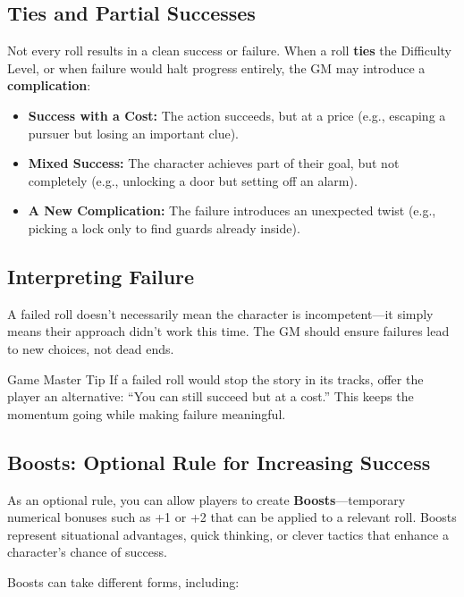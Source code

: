 \subsection{Ties and Partial Successes}
Not every roll results in a clean success or failure. When a roll \textbf{ties} the Difficulty Level, or when failure would halt progress entirely, the GM may introduce a \textbf{complication}:

\begin{itemize}
    \item \textbf{Success with a Cost:} The action succeeds, but at a price (e.g., escaping a pursuer but losing an important clue).
    \item \textbf{Mixed Success:} The character achieves part of their goal, but not completely (e.g., unlocking a door but setting off an alarm).
    \item \textbf{A New Complication:} The failure introduces an unexpected twist (e.g., picking a lock only to find guards already inside).
\end{itemize}

\subsection{Interpreting Failure}
A failed roll doesn’t necessarily mean the character is incompetent—it simply means their approach didn’t work this time. The GM should ensure failures lead to new choices, not dead ends.

\begin{DndComment}{Game Master Tip}
    If a failed roll would stop the story in its tracks, offer the player an alternative: “You can still succeed but at a cost.” This keeps the momentum going while making failure meaningful.
\end{DndComment}

\subsection{Boosts: Optional Rule for Increasing Success}

As an optional rule, you can allow players to create \textbf{Boosts}—temporary numerical bonuses such as +1 or +2 that can be applied to a relevant roll. Boosts represent situational advantages, quick thinking, or clever tactics that enhance a character’s chance of success.  

Boosts can take different forms, including:  

